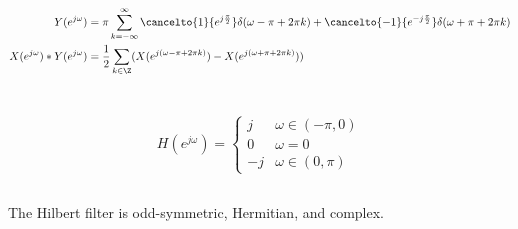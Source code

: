 \documentclass{article}
\begin{document}
\begin{align}
    Y(e^{j \omega}) &= \pi \sum_{k = -\infty}^\infty \cancelto{1}{e^{j \frac{\pi}{2}}} \delta(\omega - \pi + 2\pi k) + \cancelto{-1}{e^{-j \frac{\pi}{2}}} \delta(\omega + \pi + 2\pi k) \\
    X(e^{j \omega}) \ast Y(e^{j \omega}) &= \frac{1}{2} \sum_{k \in \Z} (X(e^{j (\omega - \pi + 2\pi k)}) - X(e^{j (\omega + \pi + 2\pi k)}))
\end{align}
\begin{center}
\end{center}

\newpage
\section{}

\begin{equation}
    H(e^{j \omega}) =
    \begin{cases}
        j & \omega \in (-\pi, 0) \\
        0 & \omega = 0 \\
        -j & \omega \in (0, \pi)
    \end{cases}
\end{equation}

\subsection{}

The Hilbert filter is odd-symmetric, Hermitian, and complex.

\subsection{}
\end{document}
